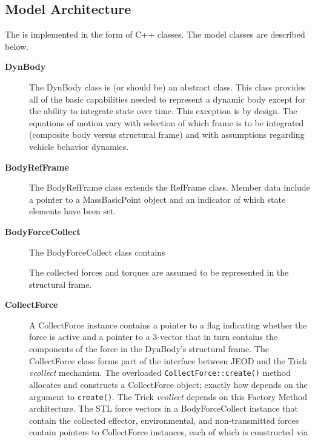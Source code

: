 \subsection{Model Architecture}
The \ModelDesc is implemented in the form of C++ classes. The model classes
are described below.
\begin{description}
\item[\bf DynBody] The DynBody class is (or should be) an abstract class.
  This class provides all of the basic capabilities needed to represent a
  dynamic body except for the ability to integrate state over time. This
  exception is by design. The equations of motion vary with selection of which
  frame is to be integrated (composite body versus structural frame) and with
  assumptions regarding vehicle behavior dynamics.
\item[\bf BodyRefFrame] The BodyRefFrame class extends the RefFrame class.
  Member data include a pointer to a MassBasicPoint object and an indicator
  of which state elements have been set.
\item[\bf BodyForceCollect] The BodyForceCollect class contains
   The collected forces and torques are assumed to be
  represented in the structural frame.
\item[\bf CollectForce] A CollectForce instance contains a pointer to a flag
  indicating whether the force is active and a pointer to a 3-vector that in
  turn contains the components of the force in the DynBody's structural frame.
  The CollectForce class forms part of the interface
  between JEOD and the Trick \emph{vcollect} mechanism.
  The overloaded {\tt CollectForce::create()} method allocates and constructs a
  CollectForce object; exactly how depends on the argument to {\tt create()}.
  The Trick \emph{vcollect} depends on this Factory Method architecture.
  The STL force vectors in a BodyForceCollect instance that contain the
  collected effector, environmental, and non-transmitted forces contain
  pointers to CollectForce instances, each of which is constructed via

\end{description}
